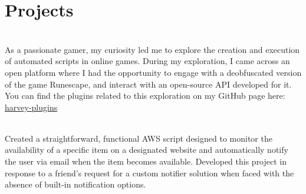 \documentclass[a4paper,10pt]{extarticle} %
\begin{document}
{\begin{tabularx}{\linewidth}{ l | X }


\end{tabularx}


\section{\textcolor{primary}{Projects}}
\vspace{0.1cm}
\begin{description}
\sloppy

\item[Automated MMORPG Scripts]\hfill \\
As a passionate gamer, my curiosity led me to explore the creation and execution of automated scripts in online games. During my exploration, I came across an open platform where I had the opportunity to engage with a deobfuscated version of the game Runescape, and interact with an open-source API developed for it. You can find the plugins related to this exploration on my GitHub page here: \href{https://github.com/harveylx/harvey-plugins}{harvey-plugins}

\item[AWS Stock Checker]\hfill \\
Created a straightforward, functional AWS script designed to monitor the availability of a specific item on a designated website and automatically notify the user via email when the item becomes available. Developed this project in response to a friend's request for a custom notifier solution when faced with the absence of built-in notification options.


\end{description}}
\end{document}
